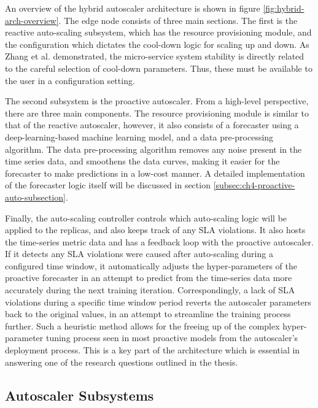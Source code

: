 An overview of the hybrid autoscaler architecture is shown in figure \ref{fig:hybrid-arch-overview}. The edge node consists of three main sections. The first is the reactive auto-scaling subsystem, which has the resource provisioning module, and the configuration which dictates the cool-down logic for scaling up and down. As Zhang et al. \cite{zhang2019quantifying} demonstrated, the micro-service system stability is directly related to the careful selection of cool-down parameters. Thus, these must be available to the user in a configuration setting.\par

The second subsystem is the proactive autoscaler. From a high-level perspective, there are three main components. The resource provisioning module is similar to that of the reactive autoscaler, however, it also consists of a forecaster using a deep-learning-based machine learning model, and a data pre-processing algorithm. The data pre-processing algorithm removes any noise present in the time series data, and smoothens the data curves, making it easier for the forecaster to make predictions in a low-cost manner. A detailed implementation of the forecaster logic itself will be discussed in section \ref{subsec:ch4-proactive-auto-subsection}.\par

Finally, the auto-scaling controller controls which auto-scaling logic will be applied to the replicas, and also keeps track of any SLA violations. It also hosts the time-series metric data and has a feedback loop with the proactive autoscaler. If it detects any SLA violations were caused after auto-scaling during a configured time window, it automatically adjusts the hyper-parameters of the proactive forecaster in an attempt to predict from the time-series data more accurately during the next training iteration. Correspondingly, a lack of SLA violations during a specific time window period reverts the autoscaler parameters back to the original values, in an attempt to streamline the training process further. Such a heuristic method allows for the freeing up of the complex hyper-parameter tuning process seen in most proactive models from the autoscaler's deployment process. This is a key part of the architecture which is essential in answering one of the research questions outlined in the thesis.\par


\subsection{Autoscaler Subsystems}
\label{subsec:ch3-hybrid-arch}

